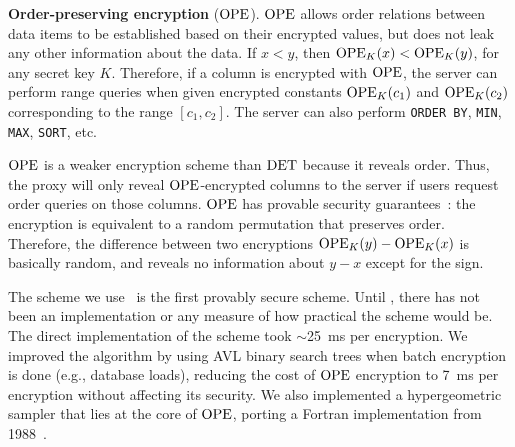 \textbf{Order-preserving encryption} ($\textrm{OPE}$)\@. $\textrm{OPE}$ allows order
relations between data items to be established based on their
encrypted values, but does not leak any other information about the
data. If $x < y$, then $\textrm{OPE}_K(x) < \textrm{OPE}_K(y)$, for any secret key $K$\@.
Therefore, if a column is encrypted with $\textrm{OPE}$, the server can
perform range queries when given encrypted constants $\textrm{OPE}_K(c_1)$ and
$\textrm{OPE}_K(c_2)$ corresponding to the range $[c_1, c_2]$.  The server can
also perform {\tt ORDER BY}, {\tt MIN}, {\tt MAX}, {\tt SORT}, etc.

$\textrm{OPE}$ is a weaker encryption scheme than $\textrm{DET}$ because it reveals
order.  Thus, the \name{} proxy will only reveal $\textrm{OPE}$-encrypted
columns to the server if users request order queries on those
columns. $\textrm{OPE}$ has provable security guarantees~\cite{boldyreva-ope}: the encryption is
equivalent to a random permutation that preserves order.  Therefore,
the difference between two encryptions $\textrm{OPE}_K(y) - \textrm{OPE}_K(x)$ is
basically random, and reveals no information about $y - x$ except for
the sign.

The scheme we use~\cite{boldyreva-ope} is the first provably secure
scheme.  Until \name{}, there has not been an implementation or any
measure of how practical the scheme would be.  The direct
implementation of the scheme took $\sim$25~ms per encryption.  We
improved the algorithm by using AVL binary search trees when batch
encryption is done (e.g., database loads), reducing the cost of $\textrm{OPE}$
encryption to 7~ms per encryption without affecting its security. We
also implemented a hypergeometric sampler that lies at the core of
$\textrm{OPE}$, porting a Fortran implementation from 1988~\cite{HGD88}.




